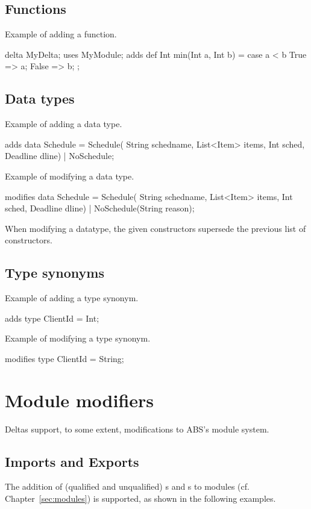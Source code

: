 \subsection{Functions}
Example of adding a function.

\begin{abscode}
delta MyDelta;
uses MyModule;
adds def Int min(Int a, Int b) = case a < b { True => a; False => b; };
\end{abscode}

\subsection{Data types}
\label{sec:data types}
Example of adding a data type.
\begin{abscode}
adds data Schedule = Schedule(
    String schedname,
    List<Item> items,
    Int sched,
    Deadline dline) | NoSchedule;
\end{abscode}

\noindent
Example of modifying a data type.
\begin{abscode}
modifies data Schedule = Schedule(
    String schedname,
    List<Item> items,
    Int sched,
    Deadline dline) | NoSchedule(String reason);
\end{abscode}
When modifying a datatype, the given constructors supersede the previous
list of constructors.

\subsection{Type synonyms}
Example of adding a type synonym.
\begin{abscode}
adds type ClientId = Int;
\end{abscode}

\noindent
Example of modifying a type synonym.
\begin{abscode}
modifies type ClientId = String;
\end{abscode}


\section{Module modifiers}
Deltas support, to some extent, modifications to ABS's module system.

\subsection{Imports and Exports}
The addition of (qualified and unqualified) s and s to modules
(cf. Chapter~\ref{sec:modules}) is supported, as shown in the following examples.

